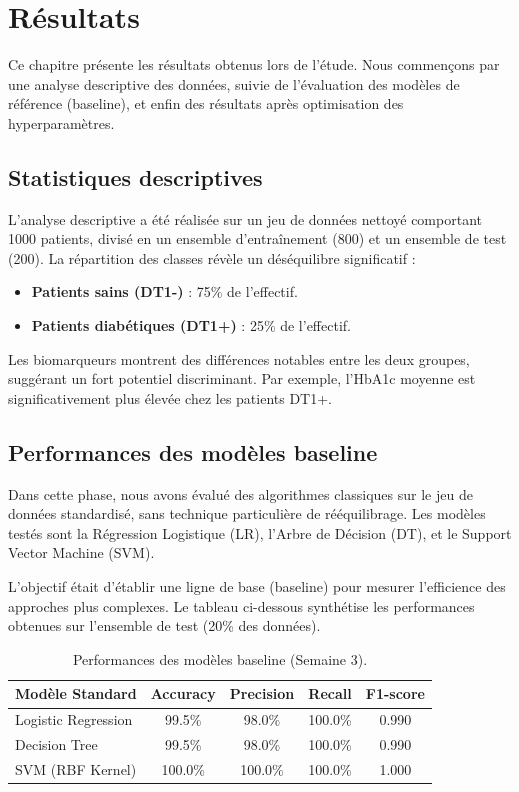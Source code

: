 \chapter{Résultats}
\label{chap:resultats}

Ce chapitre présente les résultats obtenus lors de l'étude. Nous commençons par une analyse descriptive des données, suivie de l'évaluation des modèles de référence (baseline), et enfin des résultats après optimisation des hyperparamètres.

\section{Statistiques descriptives}

L'analyse descriptive a été réalisée sur un jeu de données nettoyé comportant 1000 patients, divisé en un ensemble d'entraînement (800) et un ensemble de test (200).
La répartition des classes révèle un déséquilibre significatif :
\begin{itemize}
    \item \textbf{Patients sains (DT1-)} : 75\% de l'effectif.
    \item \textbf{Patients diabétiques (DT1+)} : 25\% de l'effectif.
\end{itemize}

Les biomarqueurs montrent des différences notables entre les deux groupes, suggérant un fort potentiel discriminant. Par exemple, l'HbA1c moyenne est significativement plus élevée chez les patients DT1+.

\section{Performances des modèles baseline}

Dans cette phase, nous avons évalué des algorithmes classiques sur le jeu de données standardisé, sans technique particulière de rééquilibrage. Les modèles testés sont la Régression Logistique (LR), l'Arbre de Décision (DT), et le Support Vector Machine (SVM).

L'objectif était d'établir une ligne de base (baseline) pour mesurer l'efficience des approches plus complexes. Le tableau ci-dessous synthétise les performances obtenues sur l'ensemble de test (20\% des données).

\begin{table}[h]
\centering
\begin{tabular}{|l|c|c|c|c|}
\hline
\textbf{Modèle Standard} & \textbf{Accuracy} & \textbf{Precision} & \textbf{Recall} & \textbf{F1-score} \\
\hline
Logistic Regression & 99.5\% & 98.0\% & 100.0\% & 0.990 \\
Decision Tree & 99.5\% & 98.0\% & 100.0\% & 0.990 \\
SVM (RBF Kernel) & 100.0\% & 100.0\% & 100.0\% & 1.000 \\
\hline
\end{tabular}
\caption{Performances des modèles baseline (Semaine 3).}
\label{tab:baseline_results}
\end{table}

